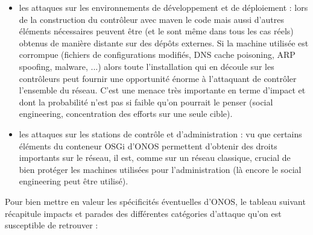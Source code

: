 \begin{itemize}
\item les attaques sur les environnements de développement et de déploiement : lors de la construction du contrôleur avec maven le code mais aussi d'autres éléments nécessaires peuvent être (et le sont même dans tous les cas réels) obtenus de manière distante sur des dépôts externes. Si la machine utilisée est corrompue (fichiers de configurations modifiés, DNS cache poisoning, ARP spoofing, malware, ...) alors toute l'installation qui en découle sur les contrôleurs peut fournir une opportunité énorme à l'attaquant de contrôler l'ensemble du réseau. C'est une menace très importante en terme d'impact et dont la probabilité n'est pas si faible qu'on pourrait le penser (social engineering, concentration des efforts sur une seule cible).

\item les attaques sur les stations de contrôle et d'administration : vu que certains éléments du conteneur OSGi d'ONOS permettent d'obtenir des droits importants sur le réseau, il est, comme sur un réseau classique, crucial de bien protéger les machines utilisées pour l'administration (là encore le social engineering peut être utilisé).

\end{itemize}

Pour bien mettre en valeur les spécificités éventuelles d'ONOS, le tableau suivant récapitule impacts et parades des différentes catégories d'attaque qu'on est susceptible de retrouver : \\~\\


